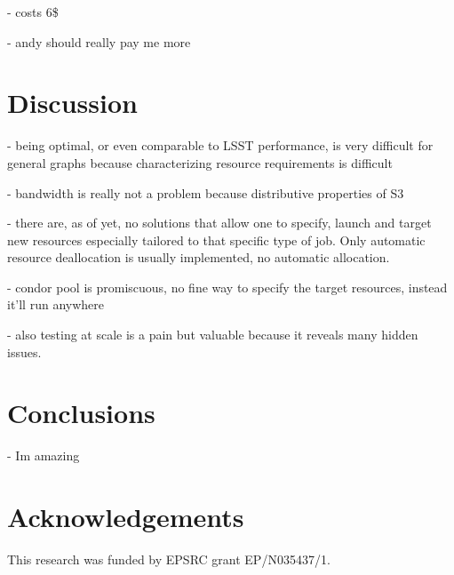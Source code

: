\documentclass[a4paper, 10pt, conference]{ieeeconf}
\begin{document}
 - costs 6\$
 
 - andy should really pay me more

\section{Discussion}
- being optimal, or even comparable to LSST performance, is very difficult for general graphs because characterizing resource requirements is difficult

- bandwidth is really not a problem because distributive properties of S3

- there are, as of yet, no solutions that allow one to specify, launch and target new resources especially tailored to that specific type of job. Only automatic resource deallocation is usually implemented, no automatic allocation. 

- condor pool is promiscuous, no fine way to specify the target resources, instead it'll run anywhere

- also testing at scale is a pain but valuable because it reveals many hidden issues.

\section{Conclusions}

- Im amazing








\section{Acknowledgements}
\noindent This research was funded by EPSRC grant EP/N035437/1.
\clearpage
\end{document}

